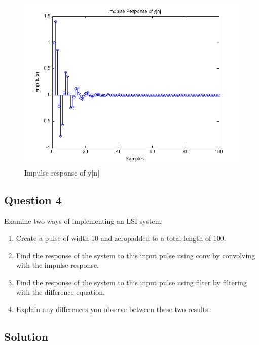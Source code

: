 \documentclass{article}
\begin{document}
\begin{figure}[here]
	\begin{center}
		\includegraphics [width=5in]{Project2_01.png}
		\caption{Impulse response of y[n]}
		\label{fig:impresp}
	\end{center}
\end{figure}

\subsection*{Question 4}

\begin{par}
Examine two ways of implementing an LSI system:
\end{par}
\begin{enumerate}
\setlength{\itemsep}{-1ex}
   \item Create a pulse of width 10 and zeropadded to a total length of 100.
   \item Find the response of the system to this input pulse using conv by convolving with the impulse response.
   \item Find the response of the system to this input pulse using filter by filtering with the difference equation.
   \item Explain any differences you observe between these two results.
\end{enumerate}


\subsection*{Solution}
\end{document}
